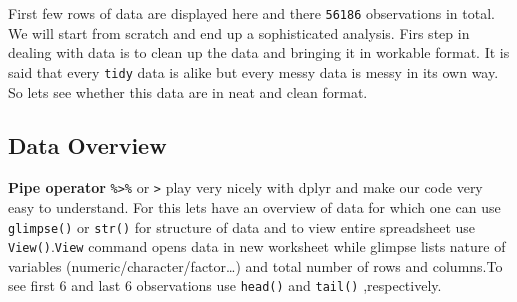 \documentclass[
  letterpaper,
  DIV=11,
  numbers=noendperiod]{scrartcl}
\begin{document}
First few rows of data are displayed here and there \texttt{56186}
observations in total. We will start from scratch and end up a
sophisticated analysis. Firs step in dealing with data is to clean up
the data and bringing it in workable format. It is said that every
\texttt{tidy} data is alike but every messy data is messy in its own
way. So lets see whether this data are in neat and clean format.

\hypertarget{data-overview}{%
\subsection{Data Overview}\label{data-overview}}

\textbf{Pipe operator} \texttt{\%\textgreater{}\%} or
\texttt{\textbar{}\textgreater{}} play very nicely with dplyr and make
our code very easy to understand. For this lets have an overview of data
for which one can use \texttt{glimpse()} or \texttt{str()} for structure
of data and to view entire spreadsheet use \texttt{View()}.\texttt{View}
command opens data in new worksheet while glimpse lists nature of
variables (numeric/character/factor\ldots) and total number of rows and
columns.To see first 6 and last 6 observations use \texttt{head()} and
\texttt{tail()} ,respectively.
\end{document}
